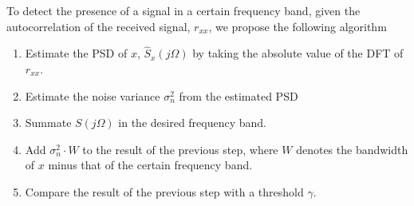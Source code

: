 \documentclass[a4paper, openany, oneside]{memoir}
\begin{document}
To detect the presence of a signal in a certain frequency band, given the autocorrelation of the received signal, $r_{xx}$,  we propose the following algorithm

\begin{enumerate}   
    \item Estimate the PSD of $x$, $\hat{S}_x(j\Omega)$  by taking the absolute value of the DFT of $r_{xx}$.
    \item Estimate the noise variance $\sigma_n^2$ from the estimated PSD
    \item Summate $S(j\Omega)$ in the desired frequency band.
    \item Add $\sigma_n^2 \cdot W$ to the result of the previous step, where $W$ denotes the bandwidth of
    $x$ minus that of the certain frequency band. 
    \item Compare the result of the previous step with a threshold $\gamma$.
\end{enumerate}






\end{document}
